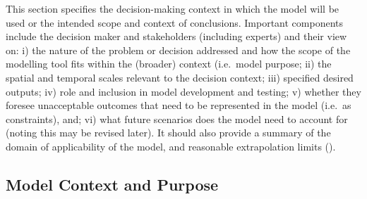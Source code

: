\documentclass[
]{article}
\begin{document}
\begin{tcolorbox}[enhanced jigsaw, opacitybacktitle=0.6, bottomrule=.15mm, leftrule=.75mm, rightrule=.15mm, colbacktitle=quarto-callout-note-color!10!white, toprule=.15mm, titlerule=0mm, left=2mm, colframe=quarto-callout-note-color-frame, breakable, title=\textcolor{quarto-callout-note-color}{\faInfo}\hspace{0.5em}{Rationale \& Explanation}, opacityback=0, coltitle=black, bottomtitle=1mm, colback=white, toptitle=1mm, arc=.35mm]

This section specifies the decision-making context in which the model
will be used or the intended scope and context of conclusions. Important
components include the decision maker and stakeholders (including
experts) and their view on: i) the nature of the problem or decision
addressed and how the scope of the modelling tool fits within the
(broader) context (i.e.~model purpose; ii) the spatial and temporal
scales relevant to the decision context; iii) specified desired outputs;
iv) role and inclusion in model development and testing; v) whether they
foresee unacceptable outcomes that need to be represented in the model
(i.e.~as constraints), and; vi) what future scenarios does the model
need to account for (noting this may be revised later). It should also
provide a summary of the domain of applicability of the model, and
reasonable extrapolation limits ().

\end{tcolorbox}

\subsection{Model Context and Purpose}\label{model-context-and-purpose}
\end{document}
